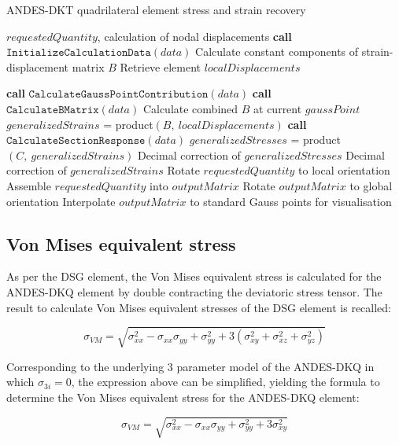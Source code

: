 \begin{algorithm}[tbh]
	\onehalfspacing
	\caption{ANDES-DKT quadrilateral element stress and strain recovery}
	\label{ANDES-DKT quadrilateral element stress and strain recovery}
	\begin{algorithmic}[1]
		\Require $requestedQuantity$, calculation of nodal displacements
		\State \textbf{call} $\texttt{InitializeCalculationData}(data)$
		\State \hspace{\algorithmicindent}Calculate constant components of strain-displacement matrix $B$
		\State \hspace{\algorithmicindent}Retrieve element $localDisplacements$
		
		\State \textbf{call} $\texttt{CalculateGaussPointContribution}(data)$
		\State \hspace{\algorithmicindent}\textbf{call} $\texttt{CalculateBMatrix}(data)$
		\State \hspace{\algorithmicindent}\hspace{\algorithmicindent} Calculate combined $B$ at current $gaussPoint$
		\State $generalizedStrains$ = product$(B,\ localDisplacements)$
		\State \textbf{call} $\texttt{CalculateSectionResponse}(data)$
		\State $generalizedStresses$ = product $(C,\ generalizedStrains)$
		\State Decimal correction of $generalizedStresses$
		\EndIf
		\State Decimal correction of $generalizedStrains$ 
		\State Rotate $requestedQuantity$ to local orientation
		\EndIf
		\State Assemble $requestedQuantity$ into $outputMatrix$
		\State Rotate $outputMatrix$ to global orientation
		\EndIf
		\State Interpolate $outputMatrix$ to standard Gauss points for visualisation
		\EndWhile
	\end{algorithmic}
\end{algorithm}

\subsection{Von Mises equivalent stress}

As per the DSG element, the Von Mises equivalent stress is calculated for the ANDES-DKQ element by double contracting the deviatoric stress tensor. The result to calculate Von Mises equivalent stresses of the DSG element is recalled:

\begin{equation} 
\sigma_{VM} = 
\sqrt{
	\sigma_{xx}^2
	- \sigma_{xx}\sigma_{yy}
	+ \sigma_{yy}^2
	+ 3(\sigma_{xy}^2 + \sigma_{xz}^2 + \sigma_{yz}^2)
}
\label{eqqrec5}
\end{equation}

Corresponding to the underlying 3 parameter model of the ANDES-DKQ in which $\sigma_{3i} = 0$, the expression above can be simplified, yielding the formula to determine the Von Mises equivalent stress for the ANDES-DKQ element:

\begin{equation} 
\sigma_{VM} = 
\sqrt{
	\sigma_{xx}^2
	- \sigma_{xx}\sigma_{yy}
	+ \sigma_{yy}^2
	+ 3\sigma_{xy}^2
}
\label{eqqrec6}
\end{equation}